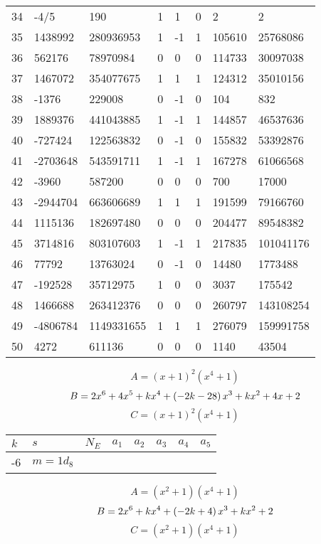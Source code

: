 \documentclass{amsart}
\begin{document}
\begin{longtable}{|l|l|l|lllll|}
34&-4/5&190&1&1&0&2&2\\
35&1438992&280936953&1&-1&1&105610&25768086\\
36&562176&78970984&0&0&0&114733&30097038\\
37&1467072&354077675&1&1&1&124312&35010156\\
38&-1376&229008&0&-1&0&104&832\\
39&1889376&441043885&1&-1&1&144857&46537636\\
40&-727424&122563832&0&-1&0&155832&53392876\\
41&-2703648&543591711&1&-1&1&167278&61066568\\
42&-3960&587200&0&0&0&700&17000\\
43&-2944704&663606689&1&1&1&191599&79166760\\
44&1115136&182697480&0&0&0&204477&89548382\\
45&3714816&803107603&1&-1&1&217835&101041176\\
46&77792&13763024&0&-1&0&14480&1773488\\
47&-192528&35712975&1&0&0&3037&175542\\
48&1466688&263412376&0&0&0&260797&143108254\\
49&-4806784&1149331655&1&1&1&276079&159991758\\
50&4272&611136&0&0&0&1140&43504\\
\hline
\end{longtable}
$$A=(x
 + 1)^{2}(x^4
 + 1)$$
$$B=2\*x^6
 + 4\*x^5
 + k\*x^4
 + \left(-2\*k
 - 28\right) \*x^3
 + k\*x^2
 + 4\*x
 + 2$$
$$C=(x
 + 1)^{2}(x^4
 + 1)$$
\begin{longtable}{|l|l|l|lllll|}
\hline
$k$ & $s$ & $N_E$ & $a_1$ & $a_2$ & $a_3$ & $a_4$ & $a_5$\\
\hline
-6&$m=1d_{8}$&&\multicolumn{5}{c|}{}\\
\hline
\end{longtable}
$$A=(x^2
 + 1)(x^4
 + 1)$$
$$B=2\*x^6
 + k\*x^4
 + \left(-2\*k
 + 4\right) \*x^3
 + k\*x^2
 + 2$$
$$C=(x^2
 + 1)(x^4
 + 1)$$
\end{document}
